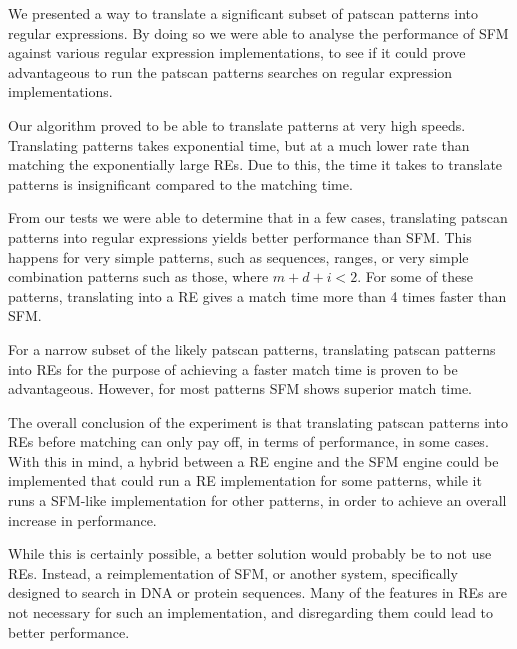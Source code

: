 \documentclass[12pt]{article}
\theoremstyle{definition}
\begin{document}
We presented a way to translate a significant subset of patscan patterns into regular expressions. By doing so we were able to analyse the performance of SFM against various regular expression implementations, to see if it could prove advantageous to run the patscan patterns searches on regular expression implementations.

Our algorithm proved to be able to translate patterns at very high speeds. Translating patterns takes exponential time, but at a much lower rate than matching the exponentially large REs. Due to this, the time it takes to translate patterns is insignificant compared to the matching time.

From our tests we were able to determine that in a few cases, translating patscan patterns into regular expressions yields better performance than SFM. This happens for very simple patterns, such as sequences, ranges, or very simple combination patterns such as those, where $m+d+i<2$. For some of these patterns, translating into a RE gives a match time more than 4 times faster than SFM.

For a narrow subset of the likely patscan patterns, translating patscan patterns into REs for the purpose of achieving a faster match time is proven to be advantageous. However, for most patterns SFM shows superior match time.

The overall conclusion of the experiment is that translating patscan patterns into REs before matching can only pay off, in terms of performance, in some cases. With this in mind, a hybrid between a RE engine and the SFM engine could be implemented that could run a RE implementation for some patterns, while it runs a SFM-like implementation for other patterns, in order to achieve an overall increase in performance.

While this is certainly possible, a better solution would probably be to not use REs. Instead, a reimplementation of SFM, or another system, specifically designed to search in DNA or protein sequences. Many of the features in REs are not necessary for such an implementation, and disregarding them could lead to better performance.


\newpage


\nocite{*}

\end{document}
